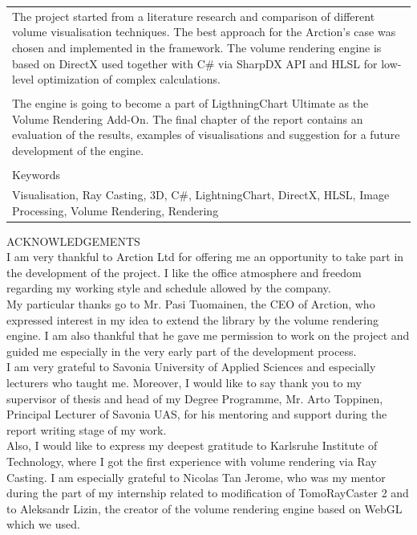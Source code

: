 \documentclass[twoside, english, 11pt]{report}
\begin{document}
\begin{table}[!h]
\begin{tabular}{| l | l | l | l |}
\multicolumn{4}{|p{14cm}|}{
The project started from a literature research and comparison of different volume visualisation techniques. The best approach for the Arction's case was chosen and implemented in the framework. The volume rendering engine is based on DirectX used together with C\# via SharpDX API and HLSL for low-level optimization of complex calculations.
}\\
\multicolumn{4}{|l|}{ }\\
\multicolumn{4}{|p{14cm}|}{
The engine is going to become a part of LigthningChart Ultimate as the Volume Rendering Add-On. The final chapter of the report contains an evaluation of the results, examples of visualisations and suggestion for a future development of the engine.
}\\
\multicolumn{4}{|l|}{ }\\
\hline
\multicolumn{4}{|l|}{Keywords}\\
\multicolumn{4}{|p{14cm}|}{
Visualisation, Ray Casting, 3D, C\#, LightningChart, DirectX, HLSL, Image Processing, Volume Rendering, Rendering
}\\
\hline
\end{tabular}
\end{table}

\newpage

ACKNOWLEDGEMENTS\\

I am very thankful to Arction Ltd for offering me an opportunity to take part in the development of the project. I like the office atmosphere and freedom regarding my working style and schedule allowed by the company.\\

My particular thanks go to Mr. Pasi Tuomainen, the CEO of Arction, who expressed interest in my idea to extend the library by the volume rendering engine. I am also thankful that he gave me permission to work on the project and guided me especially in the very early part of the development process.\\

I am very grateful to Savonia University of Applied Sciences and especially lecturers who taught me.  Moreover, I would like to say thank you to my supervisor of thesis and head of my Degree Programme, Mr. Arto Toppinen, Principal Lecturer of Savonia UAS, for his mentoring and support during the report writing stage of my work. \\

Also, I would like to express my deepest gratitude to Karlsruhe Institute of Technology, where I got the first experience with volume rendering via Ray Casting. I am especially grateful to Nicolas Tan Jerome, who was my mentor during the part of my internship related to modification of TomoRayCaster 2 and to Aleksandr Lizin, the creator of the volume rendering engine based on WebGL which we used.
\end{document}
